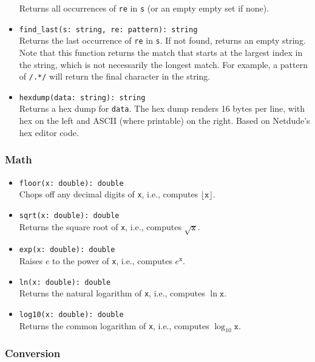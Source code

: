\documentclass[10pt,landscape]{article}
\begin{document}
\begin{multicols*}{2}
\begin{itemize}
    Returns all occurrences of \texttt{re} in \texttt{s} (or an empty empty set
    if none).
  \item \verb|find_last(s: string, re: pattern): string|\\
    Returns the last occurrence of \texttt{re} in \texttt{s}. If not found,
    returns an empty string.  Note that this function returns the match that
    starts at the largest index in the string, which is not necessarily the
    longest match.  For example, a pattern of \texttt{/.*/} will return the
    final character in the string.
  \item \verb|hexdump(data: string): string|\\
    Returns a hex dump for \texttt{data}. The hex dump renders 16 bytes per
    line, with hex on the left and ASCII (where printable) on the right. Based
    on Netdude's hex editor code.
\end{itemize}

\subsubsection*{Math}

\begin{itemize}
  \item \verb|floor(x: double): double|\\
    Chops off any decimal digits of \texttt{x},
    i.e., computes $\lfloor\mathtt{x}\rfloor$.
  \item \verb|sqrt(x: double): double|\\
    Returns the square root of \texttt{x}, i.e., computes $\sqrt{\mathtt{x}}$.
  \item \verb|exp(x: double): double|\\
    Raises $e$ to the power of \texttt{x}, i.e., computes $e^\mathtt{x}$.
  \item \verb|ln(x: double): double|\\
    Returns the natural logarithm of \texttt{x},
    i.e., computes $\ln \mathtt{x}$.
  \item \verb|log10(x: double): double|\\
    Returns the common logarithm of \texttt{x},
    i.e., computes $\log_{10} \mathtt{x}$.
\end{itemize}

\subsubsection*{Conversion}


\end{multicols*}
\end{document}
